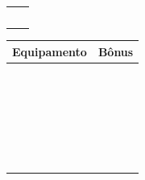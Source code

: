 \documentclass[a4paper,12pt]{article}
\begin{document}
\begin{multicols}{2}
\begin{center}
\begin{tabular}{|m{6cm}|c|}
            \hline
                        & \\
            \hline
                        & \\
            \hline
                        & \\
            \hline
                        & \\
            \hline
                        & \\
            \hline
                        & \\
            \hline
        \end{tabular}
               \begin{tabular}{|m{6cm}|c|}
            \hline
            \textbf{Equipamento} & \textbf{Bônus} \\
            \hline
            & \\
            \hline
            & \\
            \hline
            & \\
            \hline
            & \\
            \hline
            & \\
            \hline
            & \\
            \hline
            & \\
            \hline
            & \\
            \hline
            & \\
            \hline
            & \\
            \hline
            & \\
            \hline
            & \\
            \hline
                        & \\
            \hline
                        & \\
            \hline
                        & \\
            \hline
                        & \\
            \hline
                        & \\
            \hline
                        & \\
            \hline
                        & \\
            \hline
                        & \\
            \hline
                        & \\
            \hline
                        & \\
            \hline
                        & \\
            \hline
                        & \\
            \hline
                        & \\
            \hline
                        & \\
            \hline
        \end{tabular}
\end{center}
\end{multicols}
\end{document}
